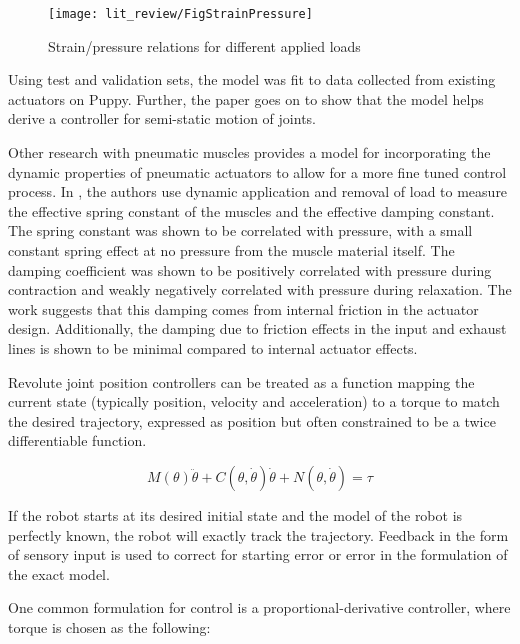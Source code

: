\begin{figure}[h!]
\centering
\texttt{[image: lit\_review/FigStrainPressure]}
\caption{Strain/pressure relations for different applied loads}
\label{fig:StrainPressure}
\end{figure}

Using test and validation sets, the model was fit to data collected
from existing actuators on Puppy. Further, the paper goes on to show that the
model helps derive a controller for semi-static motion of joints. 
\cite{HuntPMuscles}

Other research with pneumatic muscles provides a model for incorporating the
dynamic properties of pneumatic actuators to allow for a more fine tuned control
process. In \cite{DynamicPMuscles}, the authors use dynamic application and
removal of load to measure the effective spring constant of the muscles and the
effective damping constant. The spring constant was shown to be correlated with
pressure, with a small constant spring effect at no pressure from the muscle
material itself. The damping coefficient was shown to be positively correlated
with pressure during contraction and weakly negatively correlated with pressure
during relaxation. The work suggests that this damping comes from internal
friction in the actuator design. Additionally, the damping due to friction
effects in the input and exhaust lines is shown to be minimal compared to
internal actuator effects. \cite{DynamicPMuscles}



Revolute joint position controllers can be treated as a function mapping the current
state (typically position, velocity and acceleration) to a torque to match the 
desired trajectory, expressed as position but often constrained to be a twice
differentiable function.

\begin{equation}
M(\theta) \ddot{\theta} + C(\theta, \dot{\theta}) \dot{\theta} + N(\theta, \dot{\theta}) = \tau
\end{equation}

If the robot starts at its desired initial state and the model of the robot is
perfectly known, the robot will exactly track the trajectory. Feedback in the 
form of sensory input is used to correct for starting error or error in the 
formulation of the exact model.

One common formulation for control is a proportional-derivative controller, 
where torque is chosen as the following:

